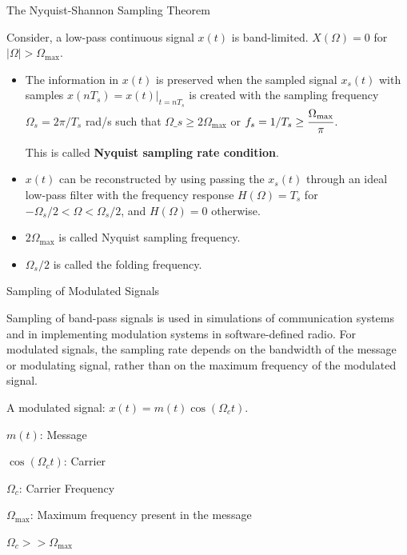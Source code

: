\documentclass[aspectratio=169,xcolor=dvipsnames,svgnames,x11names,fleqn]{beamer}
\begin{document}
\begin{frame}{The Nyquist-Shannon Sampling Theorem}

Consider, a low-pass continuous signal $x(t)$ is band-limited. $X(\Omega) = 0 $ for $|\Omega| > \Omega_{\textrm{max}}$.

\begin{itemize}
    \item The information in $x(t)$ is preserved when the sampled signal $x_s(t)$ with samples $x(nT_s) = x(t) |_{t = nT_s}$ is created with the sampling frequency $\Omega_s = 2\pi/{T_s}$ rad/s such that $\Omega\_s \geq 2\Omega_{\textrm{max}}$ or $f_s = 1/T_s \geq \cfrac{\Omega_{\textrm{max}}}{\pi}$. 
    
    This is called \colorbox{green!30}{\textbf{Nyquist sampling rate condition}}.

    \item $x(t)$ can be reconstructed by using passing the $x_s(t)$ through an ideal low-pass filter with the frequency response 
    $H(\Omega) = T_s$ for $-\Omega_s/2 < \Omega < \Omega_s/2$, and $H(\Omega) = 0$ otherwise.

    \item $2\Omega_{\textrm{max}}$ is called Nyquist sampling frequency. 
    \item $\Omega_s/2$ is called the folding frequency.
\end{itemize}
    
\end{frame}

\begin{frame}{Sampling of Modulated Signals}
\begin{gradyellow}

Sampling of band-pass signals is used in simulations of communication systems and in implementing modulation systems in software-defined radio.
\vspace{5pt}
    For modulated signals, the sampling rate depends on the bandwidth of the message or modulating signal, rather than on the maximum frequency of the modulated signal.
\end{gradyellow}

A modulated signal: $x(t) = m(t)\cos(\Omega_c t)$.

$m(t)$: Message

$\cos(\Omega_c t)$: Carrier

$\Omega_c$: Carrier Frequency

$\Omega_{\textrm{max}}$: Maximum frequency present in the message

$\Omega_c >> \Omega_{\textrm{max}}$
\end{frame}
\end{document}
